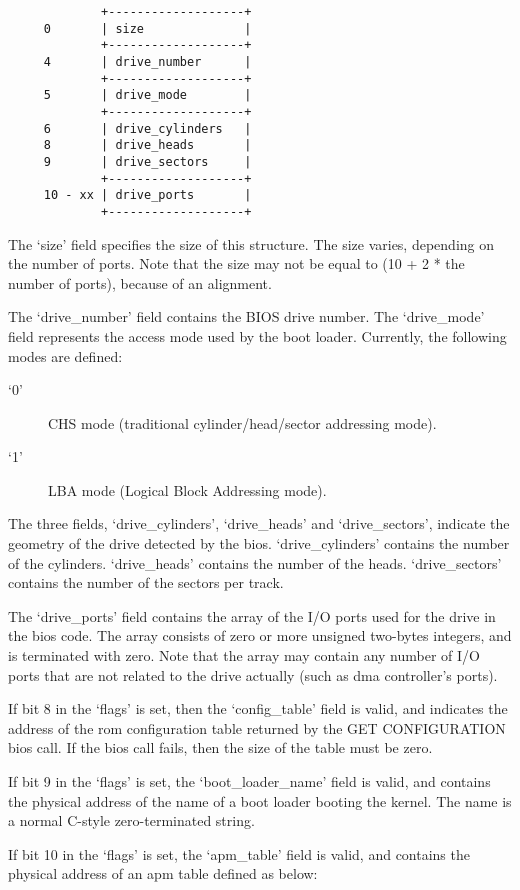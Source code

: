 \begin{verbatim}
             +-------------------+
     0       | size              |
             +-------------------+
     4       | drive_number      |
             +-------------------+
     5       | drive_mode        |
             +-------------------+
     6       | drive_cylinders   |
     8       | drive_heads       |
     9       | drive_sectors     |
             +-------------------+
     10 - xx | drive_ports       |
             +-------------------+
\end{verbatim}

The ‘size’ field specifies the size of this structure. The size varies,
depending on the number of ports. Note that the size may not be equal to (10 + 2
* the number of ports), because of an alignment.

The ‘drive\_number’ field contains the BIOS drive number. The ‘drive\_mode’
field represents the access mode used by the boot loader. Currently, the
following modes are defined:

\begin{description}
\item[‘0’]
CHS mode (traditional cylinder/head/sector addressing mode). 
\item[‘1’]
LBA mode (Logical Block Addressing mode).
\end{description}

The three fields, ‘drive\_cylinders’, ‘drive\_heads’ and ‘drive\_sectors’,
indicate the geometry of the drive detected by the bios. ‘drive\_cylinders’
contains the number of the cylinders. ‘drive\_heads’ contains the number of the
heads. ‘drive\_sectors’ contains the number of the sectors per track.

The ‘drive\_ports’ field contains the array of the I/O ports used for the drive
in the bios code. The array consists of zero or more unsigned two-bytes
integers, and is terminated with zero. Note that the array may contain any
number of I/O ports that are not related to the drive actually (such as dma
controller's ports).

If bit 8 in the ‘flags’ is set, then the ‘config\_table’ field is valid, and
indicates the address of the rom configuration table returned by the GET
CONFIGURATION bios call. If the bios call fails, then the size of the table must
be zero.

If bit 9 in the ‘flags’ is set, the ‘boot\_loader\_name’ field is valid, and
contains the physical address of the name of a boot loader booting the kernel.
The name is a normal C-style zero-terminated string.

If bit 10 in the ‘flags’ is set, the ‘apm\_table’ field is valid, and contains
the physical address of an apm table defined as below:

\secup





\secup